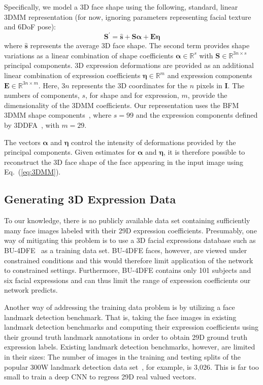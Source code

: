 \documentclass[a4paper, 10pt, conference]{ieeeconf}
\def\mbf#1{\mathbf{#1}}
\begin{document}
Specifically, we model a 3D face shape using the following, standard, linear 3DMM representation (for now, ignoring parameters representing facial texture and 6DoF pose):
\begin{equation}
\mbf{S}^{\prime} = \widehat{\mbf{s}} + \mbf{S} \boldsymbol{\alpha} + \mbf{E} \boldsymbol{\eta}
\label{eq:3DMM}
\end{equation}
where $\widehat{\mbf{s}}$ represents the average 3D face shape. The second term provides shape variations as a linear combination of shape coefficients $\boldsymbol{\alpha} \in \mathbb{R}^s$ with $\mbf{S}\in \mathbb{R}^{3n\times s}$ principal components. 3D expression deformations are provided as an additional linear combination of expression coefficients $\boldsymbol{\eta}\in \mathbb{R}^{m}$ and expression components $\mbf{E}\in \mathbb{R}^{3n\times m}$. Here, $3n$ represents the 3D coordinates for the $n$ pixels in $\mbf{I}$. The numbers of components, $s$, for shape and for expression, $m$, provide the dimensionality of the 3DMM coefficients. Our representation uses the BFM 3DMM shape components~\cite{paysan09basel}, where $s=99$ and the expression components defined by 3DDFA~\cite{zhu2015}, with $m=29$.


The vectors $\boldsymbol{\alpha}$ and $\boldsymbol{\eta}$ control the intensity of deformations provided by the principal components. Given estimates for $\boldsymbol{\alpha}$ and $\boldsymbol{\eta}$, it is therefore possible to reconstruct the 3D face shape of the face appearing in the input image using Eq.~(\ref{eq:3DMM}). 

\subsection{Generating 3D Expression Data}\label{sec:gen_data}
To our knowledge, there is no publicly available data set containing sufficiently many face images labeled with their 29D expression coefficients. Presumably, one way of mitigating this problem is to use a 3D facial expressions database such as BU-4DFE~\cite{yin2008high} as a training data set. BU-4DFE faces, however, are viewed under constrained conditions and this would therefore limit application of the network to constrained settings. Furthermore, BU-4DFE contains only 101 subjects and six facial expressions and can thus limit the range of expression coefficients our network predicts.

Another way of addressing the training data problem is by utilizing a face landmark detection benchmark. That is, taking the face images in existing landmark detection benchmarks and computing their expression coefficients using their ground truth landmark annotations in order to obtain 29D ground truth expression labels. Existing landmark detection benchmarks, however, are limited in their sizes: The number of images in the training and testing splits of the popular 300W landmark detection data set~\cite{sagonas2015300}, for example, is 3,026. This is far too small to train a deep CNN to regress 29D real valued vectors. 
\end{document}
